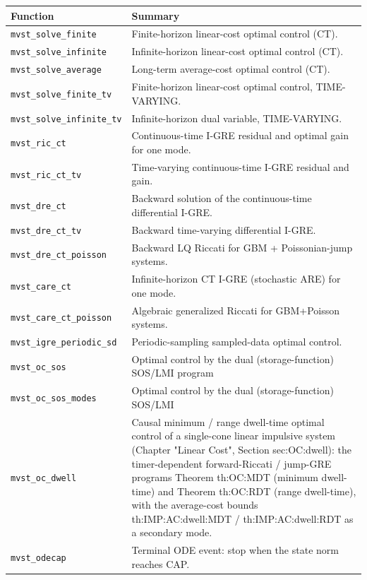 \documentclass[11pt,oneside]{report}
\newcommand{\code}[1]{\texttt{#1}}
\providecommand{\real}[1]{#1}
\begin{document}
\begin{longtable}[]{@{}
  >{\raggedright\arraybackslash}p{(\columnwidth - 2\tabcolsep) * \real{0.50}}
  >{\raggedright\arraybackslash}p{(\columnwidth - 2\tabcolsep) * \real{0.50}}@{}}
\toprule
Function & Summary \\
\midrule
\endhead
\code{mvst\_solve\_finite} & Finite-horizon linear-cost optimal control (CT). \\
\code{mvst\_solve\_infinite} & Infinite-horizon linear-cost optimal control (CT). \\
\code{mvst\_solve\_average} & Long-term average-cost optimal control (CT). \\
\code{mvst\_solve\_finite\_tv} & Finite-horizon linear-cost optimal control, TIME-VARYING. \\
\code{mvst\_solve\_infinite\_tv} & Infinite-horizon dual variable, TIME-VARYING. \\
\code{mvst\_ric\_ct} & Continuous-time I-GRE residual and optimal gain for one mode. \\
\code{mvst\_ric\_ct\_tv} & Time-varying continuous-time I-GRE residual and gain. \\
\code{mvst\_dre\_ct} & Backward solution of the continuous-time differential I-GRE. \\
\code{mvst\_dre\_ct\_tv} & Backward time-varying differential I-GRE. \\
\code{mvst\_dre\_ct\_poisson} & Backward LQ Riccati for GBM + Poissonian-jump systems. \\
\code{mvst\_care\_ct} & Infinite-horizon CT I-GRE (stochastic ARE) for one mode. \\
\code{mvst\_care\_ct\_poisson} & Algebraic generalized Riccati for GBM+Poisson systems. \\
\code{mvst\_igre\_periodic\_sd} & Periodic-sampling sampled-data optimal control. \\
\code{mvst\_oc\_sos} & Optimal control by the dual (storage-function) SOS/LMI program \\
\code{mvst\_oc\_sos\_modes} & Optimal control by the dual (storage-function) SOS/LMI \\
\code{mvst\_oc\_dwell} & Causal minimum / range dwell-time optimal control of a single-cone linear impulsive system (Chapter "Linear Cost", Section sec:OC:dwell): the timer-dependent forward-Riccati / jump-GRE programs Theorem th:OC:MDT (minimum dwell-time) and Theorem th:OC:RDT (range dwell-time), with the average-cost bounds th:IMP:AC:dwell:MDT / th:IMP:AC:dwell:RDT as a secondary mode. \\
\code{mvst\_odecap} & Terminal ODE event: stop when the state norm reaches CAP. \\
\bottomrule
\end{longtable}
\end{document}
